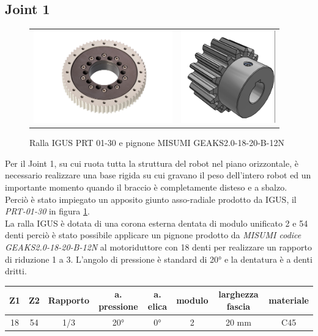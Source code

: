 \documentclass[%
corpo=11pt,
twoside,
 stile=classica,
oldstyle,
greek,%
]{toptesi}
\begin{document}
		\subsection{Joint 1}
		\begin{figure}
			\centering
			\begin{tabular}{ll}
				\includegraphics[height=4cm,keepaspectratio]{pictures/ralla.jpg}
				&
				\includegraphics[height=4cm,keepaspectratio]{pictures/pignone.png}
			\end{tabular}
			\caption{Ralla IGUS PRT 01-30 e pignone MISUMI GEAKS2.0-18-20-B-12N}
			\label{fig:RALLA}
		\end{figure}
		Per il Joint 1, su cui ruota tutta la struttura del robot nel piano orizzontale, è necessario realizzare una base rigida su cui gravano il peso dell'intero robot ed un importante momento quando il braccio è completamente disteso e a sbalzo.\\
		 Perciò è stato impiegato un apposito giunto asso-radiale prodotto da IGUS, il \textit{PRT-01-30} in figura \ref{fig:RALLA}. \\
		La ralla IGUS è dotata di una corona esterna dentata di modulo unificato 2 e 54 denti perciò è stato possibile applicare un pignone prodotto da \textit{MISUMI codice GEAKS2.0-18-20-B-12N} al motoriduttore con 18 denti per realizzare un rapporto di riduzione 1 a 3. L'angolo di pressione è standard di 20° e la dentatura è a denti dritti. 
		
		\begin{tabular}{|c|c|c|c|c|c|c|c|}
			
			\hline
			Z1 & Z2 & Rapporto & a. pressione & a. elica & modulo & larghezza fascia & materiale \\
			\hline
			18 & 54 & 1/3 & 20° & 0°  & 2 & 20 mm & C45  \\
			\hline
			
		\end{tabular}
		
\end{document}
